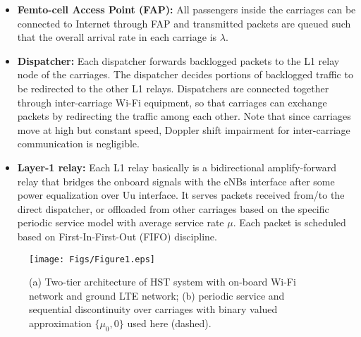 \documentclass[journal]{IEEEtran}
\begin{document}
{\begin{itemize}
	\item \textbf{Femto-cell Access Point (FAP):} All passengers inside the carriages can be connected to Internet through FAP and transmitted packets are queued such that the overall arrival rate in each carriage is $\lambda$.
	\end{itemize}

\begin{itemize}
	\item \textbf{Dispatcher:} Each dispatcher forwards backlogged packets to the L1 relay node of the carriages. The dispatcher decides portions of backlogged traffic to be redirected to the other L1 relays. Dispatchers are connected together through inter-carriage Wi-Fi equipment, so that carriages can exchange packets by redirecting the traffic among each other. Note that since carriages move at high but constant speed, Doppler shift impairment for inter-carriage communication is negligible. 
\end{itemize}

\begin{itemize}
	\item \textbf{Layer-1 relay:} Each L1 relay basically is a bidirectional amplify-forward relay that bridges the onboard signals with the eNBs interface after some power equalization over Uu interface. It serves packets received from/to the direct dispatcher, or offloaded from other carriages based on the specific periodic service model with average service rate $\mu$. Each packet is scheduled based on First-In-First-Out (FIFO) discipline.	
\end{itemize}
\par

\begin{figure}[!t]
	\centering
	\texttt{[image: Figs/Figure1.eps]}
	\caption{ (a) Two-tier architecture of HST system with on-board Wi-Fi network and ground LTE network; (b) periodic service and sequential discontinuity over carriages with binary valued approximation $\{\mu_{0},0\}$ used here (dashed).}       
	\label{Fig1}
\end{figure}

}
\end{document}
